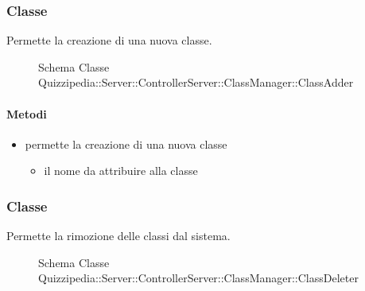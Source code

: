 \subsubsection{Classe }
Permette la creazione di una nuova classe.
\begin{figure}[H]
\centering
\noindent{}
\caption[Schema Classe ClassAdder]{Schema Classe Quizzipedia::Server::ControllerServer::ClassManager::ClassAdder}
\end{figure}
\paragraph{Metodi}
\begin{itemize}
\item {}
\newline
permette la creazione di una nuova classe
\newline
{}
\newline
\begin{itemize}
\item {}
\newline
il nome da attribuire alla classe
\end{itemize}
\end{itemize}
\subsubsection{Classe }
Permette la rimozione delle classi dal sistema.
\begin{figure}[H]
\centering
\noindent{}
\caption[Schema Classe ClassDeleter]{Schema Classe Quizzipedia::Server::ControllerServer::ClassManager::ClassDeleter}
\end{figure}
